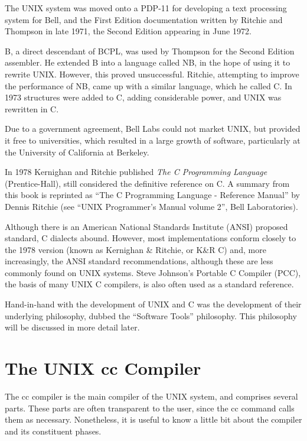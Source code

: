    The UNIX system was moved onto a PDP-11 for developing a text
processing system for Bell, and the First Edition documentation written
by Ritchie and Thompson in late 1971, the Second Edition appearing in
June 1972.

   B, a direct descendant of BCPL, was used by Thompson for the Second
Edition assembler. He extended B into a language called NB, in the hope
of using it to rewrite UNIX. However, this proved unsuccessful. Ritchie,
attempting to improve the performance of NB, came up with a similar
language, which he called C. In 1973 structures were added to C, adding
considerable power, and UNIX was rewritten in C.

   Due to a government agreement, Bell Labs could not market UNIX, but
provided it free to universities, which resulted in a large growth of
software, particularly at the University of California at Berkeley.

   In 1978 Kernighan and Ritchie published {\em The C Programming
Language\/}
(Prentice-Hall), still considered the definitive reference on C. A
summary from this book is reprinted as ``The C Programming Language -
Reference Manual'' by Dennis Ritchie (see ``UNIX Programmer's Manual
volume 2'', Bell Laboratories).

   Although there is an American National Standards Institute (ANSI)
proposed standard, C dialects abound. However, most implementations
conform closely to the 1978 version (known as Kernighan \& Ritchie, or
K\&R C) and, more increasingly, the ANSI standard recommendations,
although these are less commonly found on UNIX systems. Steve
Johnson's Portable C Compiler (PCC), the basis of many UNIX C
compilers, is also often used as a standard reference.

   Hand-in-hand with the development of UNIX and C was the development
of their underlying philosophy, dubbed the ``Software Tools'' 
philosophy.
This philosophy will be discussed in more detail later.

\section{The UNIX {\cmd cc} Compiler}

     The {\cmd cc} compiler is the main compiler of the UNIX system,
and comprises  several parts.  These parts  are often  transparent to
the user,  since  the  {\cmd cc} command calls them as necessary.
Nonetheless, it is useful to know a little bit about the compiler and
its constituent phases.

